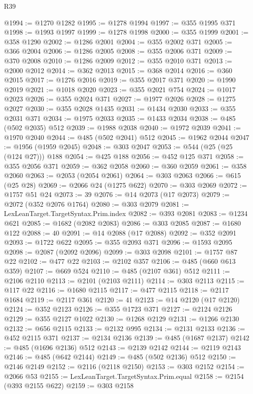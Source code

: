 \begin{lexlean}{R39}
\begin{coremodule}
@1994 := @1270 @1282
@1995 := @1278 @1994
@1997 := @355 @1995 @371
@1998 := @1993 @1997
@1999 := @1278 @1998
@2000 := @355 @1999
@2001 := @358 @1290
@2002 := @1286 @2001
@2004 := @355 @2002 @371
@2005 := @366 @2004
@2006 := @1286 @2005
@2008 := @355 @2006 @371
@2009 := @370 @2008
@2010 := @1286 @2009
@2012 := @355 @2010 @371
@2013 := @2000 @2012
@2014 := @362 @2013
@2015 := @368 @2014
@2016 := @360 @2015
@2017 := @1276 @2016
@2019 := @355 @2017 @371
@2020 := @1990 @2019
@2021 := @1018 @2020
@2023 := @355 @2021 @754
@2024 := @1017 @2023
@2026 := @355 @2024 @371
@2027 := @1977 @2026
@2028 := @1275 @2027
@2030 := @355 @2028 @1435
@2031 := @1434 @2030
@2033 := @355 @2031 @371
@2034 := @1975 @2033
@2035 := @1433 @2034
@2038 := @485 (@502 @2035) @512
@2039 := @1988 @2038
@2040 := @1972 @2039
@2041 := @1970 @2040
@2044 := @485 (@502 @2041) @512
@2045 := @1962 @2044
@2047 := @1956 (@1959 @2045)
@2048 := @303 @2047
@2053 := @544 (@25 (@25 (@124 @27))) @188
@2054 := @425 @188
@2056 := @452 @125 @371
@2058 := @355 @2056 @371
@2059 := @362 @2058
@2060 := @360 @2059
@2061 := @358 @2060
@2063 := @2053 (@2054 @2061)
@2064 := @303 @2063
@2066 := @615 (@25 @28)
@2069 := @2066 @24 (@1275 @622)
@2070 := @303 @2069
@2072 := @1757 @51 @24
@2073 := 39
@2076 := @14 @2073 (@17 @2073)
@2079 := @2072 (@352 @2076 @1764)
@2080 := @303 @2079
@2081 := LexLeanTarget.TargetSyntax.Prim.index
@2082 := @393 @2081
@2083 := @1234 @621
@2085 := @1682 (@2082 @2083)
@2086 := @303 @2085
@2087 := @1680 @122
@2088 := 40
@2091 := @14 @2088 (@17 @2088)
@2092 := @352 @2091
@2093 := @1722 @622
@2095 := @355 @2093 @371
@2096 := @1593 @2095
@2098 := @2087 (@2092 @2096)
@2099 := @303 @2098
@2101 := @1757 @87 @22
@2102 := @477 @22
@2103 := @2102 @357
@2106 := @485 (@660 @613 @359)
@2107 := @669 @524
@2110 := @485 (@2107 @361) @512
@2111 := @2106 @2110
@2113 := @2101 (@2103 @2111)
@2114 := @303 @2113
@2115 := @117 @22
@2116 := @1680 @2115
@2117 := @477 @2115
@2118 := @2117 @1684
@2119 := @2117 @361
@2120 := 41
@2123 := @14 @2120 (@17 @2120)
@2124 := @352 @2123
@2126 := @355 @1723 @371
@2127 := @2124 @2126
@2129 := @355 @2127 @1022
@2130 := @1268 @2129
@2131 := @1266 @2130
@2132 := @656 @2115
@2133 := @2132 @995
@2134 := @2131 @2133
@2136 := @452 @2115 @371
@2137 := @2134 @2136
@2139 := @485 (@1687 @2137)
@2142 := @485 (@1696 @2136) @512
@2143 := @2139 @2142
@2144 := @2119 @2143
@2146 := @485 (@642 @2144)
@2149 := @485 (@502 @2136) @512
@2150 := @2146 @2149
@2152 := @2116 (@2118 @2150)
@2153 := @303 @2152
@2154 := @2066 @53
@2155 := LexLeanTarget.TargetSyntax.Prim.equal
@2158 := @2154 (@393 @2155 @622)
@2159 := @303 @2158

\end{coremodule}
\end{lexlean}
